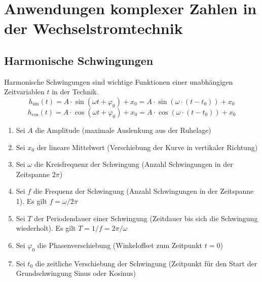 \section{Anwendungen komplexer Zahlen in der Wechselstromtechnik}
\subsection{Harmonische Schwingungen}
Harmonische Schwingungen sind wichtige Funktionen einer unabhängigen Zeitvariablen $t$ in der Technik.
\begin{equation}
\boxed{h_{\text{sin}}\left(t\right)=A\cdot \sin\left(\omega t+\varphi_0\right)+x_0=A\cdot \sin\left(\omega\cdot \left(t-t_0\right)\right)+x_0}
\end{equation}
\begin{equation}
\boxed{h_{\text{cos}}\left(t\right)=A\cdot \cos\left(\omega t+\varphi_0\right)+x_0=A\cdot \cos\left(\omega\cdot \left(t-t_0\right)\right)+x_0}
\end{equation}
\begin{enumerate}[$(a)$]
\item Sei $A$ die Amplitude (maximale Auslenkung aus der Ruhelage)
\item Sei $x_0$ der lineare Mittelwert (Verschiebung der Kurve in vertikaler Richtung)
\item Sei $\omega$ die Kreisfrequenz der Schwingung (Anzahl Schwingungen in der Zeitspanne $2\pi$)
\item Sei $f$ die Frequenz der Schwingung (Anzahl Schwingungen in der Zeitspanne 1). Es gilt $f=\omega/2\pi$
\item Sei $T$ der Periodendauer einer Schwingung (Zeitdauer bis sich die Schwingung wiederholt). Es gilt $T=1/f=2\pi/\omega$
\item Sei $\varphi_0$ die Phasenverschiebung (Winkeloffset zum Zeitpunkt $t=0$)
\item Sei $t_0$ die zeitliche Verschiebung der Schwingung (Zeitpunkt für den Start der Grundschwingung Sinus oder Kosinus)
\end{enumerate}
